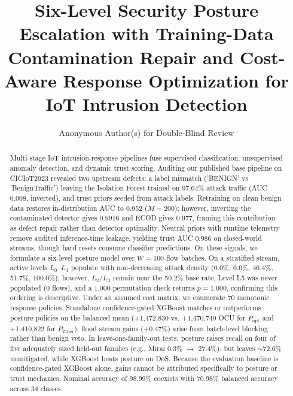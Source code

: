 \documentclass[journal,10pt,onecolumn]{IEEEtran}
\begin{document}
\title{Six-Level Security Posture Escalation with Training-Data Contamination Repair and Cost-Aware Response Optimization for IoT Intrusion Detection}

\author{Anonymous Author(s) for Double-Blind Review}

\maketitle

\begin{abstract}
Multi-stage IoT intrusion-response pipelines fuse supervised classification, unsupervised anomaly detection, and dynamic trust scoring. Auditing our published base pipeline \cite{1} on CICIoT2023 revealed two upstream defects: a label mismatch ('BENIGN' vs 'BenignTraffic') leaving the Isolation Forest trained on 97.64\% attack traffic (AUC 0.008, inverted), and trust priors seeded from attack labels. Retraining on clean benign data restores in-distribution AUC to 0.952 ($M=200$); however, inverting the contaminated detector gives 0.9916 and ECOD gives 0.977, framing this contribution as defect repair rather than detector optimality. Neutral priors with runtime telemetry remove audited inference-time leakage, yielding trust AUC 0.986 on closed-world streams, though hard resets consume classifier predictions. On these signals, we formulate a six-level posture model over $W=100$-flow batches. On a stratified stream, active levels $L_0$--$L_4$ populate with non-decreasing attack density (0.0\%, 0.0\%, 46.4\%, 51.7\%, 100.0\%); however, $L_2/L_3$ remain near the 50.2\% base rate, Level L5 was never populated (0 flows), and a 1,000-permutation check returns $p = 1.000$, confirming this ordering is descriptive. Under an assumed cost matrix, we enumerate 70 monotonic response policies. Standalone confidence-gated XGBoost matches or outperforms posture policies on the balanced mean (+1,472,830 vs. +1,470,740 OCU for $P_{\text{opt}}$ and +1,410,822 for $P_{2\text{-tier}}$); flood stream gains (+0.47\%) arise from batch-level blocking rather than benign veto. In leave-one-family-out tests, posture raises recall on four of five adequately sized held-out families (e.g., Mirai 0.3\% $\to$ 27.4\%), but leaves $\sim$72.6\% unmitigated, while XGBoost beats posture on DoS. Because the evaluation baseline is confidence-gated XGBoost alone, gains cannot be attributed specifically to posture or trust mechanics. Nominal accuracy of 98.99\% coexists with 70.98\% balanced accuracy across 34 classes.
\end{abstract}
\end{document}
